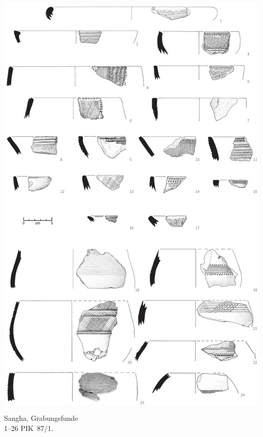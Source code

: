 \begin{pl}[H]
	\includegraphics{plt/Taf46.pdf}
	\vspace{.75em}\caption{\mbox{Sangha}, Grabungsfunde \\ 1--26 PIK~87/1.}
	\label{pl:46}
\end{pl}

